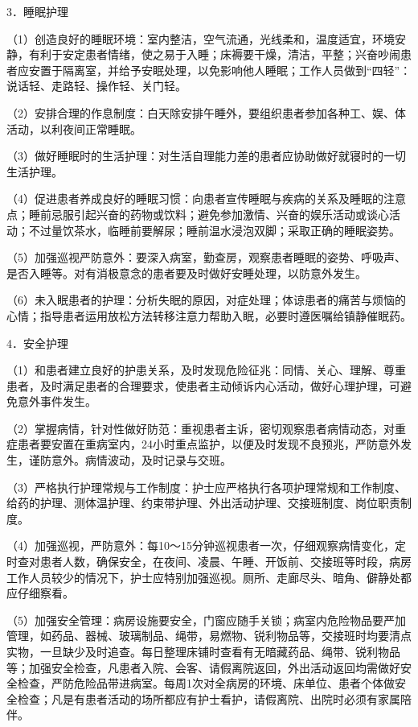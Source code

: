 3．睡眠护理

（1）创造良好的睡眠环境：室内整洁，空气流通，光线柔和，温度适宜，环境安静，有利于安定患者情绪，使之易于入睡；床褥要干燥，清洁，平整；兴奋吵闹患者应安置于隔离室，并给予安眠处理，以免影响他人睡眠；工作人员做到“四轻”：说话轻、走路轻、操作轻、关门轻。

（2）安排合理的作息制度：白天除安排午睡外，要组织患者参加各种工、娱、体活动，以利夜间正常睡眠。

（3）做好睡眠时的生活护理：对生活自理能力差的患者应协助做好就寝时的一切生活护理。

（4）促进患者养成良好的睡眠习惯：向患者宣传睡眠与疾病的关系及睡眠的注意点；睡前忌服引起兴奋的药物或饮料；避免参加激情、兴奋的娱乐活动或谈心活动；不过量饮茶水，临睡前要解尿；睡前温水浸泡双脚；采取正确的睡眠姿势。

（5）加强巡视严防意外：要深入病室，勤查房，观察患者睡眠的姿势、呼吸声、是否入睡等。对有消极意念的患者要及时做好安睡处理，以防意外发生。

（6）未入眠患者的护理：分析失眠的原因，对症处理；体谅患者的痛苦与烦恼的心情；指导患者运用放松方法转移注意力帮助入眠，必要时遵医嘱给镇静催眠药。

4．安全护理

（1）和患者建立良好的护患关系，及时发现危险征兆：同情、关心、理解、尊重患者，及时满足患者的合理要求，使患者主动倾诉内心活动，做好心理护理，可避免意外事件发生。

（2）掌握病情，针对性做好防范：重视患者主诉，密切观察患者病情动态，对重症患者要安置在重病室内，24小时重点监护，以便及时发现不良预兆，严防意外发生，谨防意外。病情波动，及时记录与交班。

（3）严格执行护理常规与工作制度：护士应严格执行各项护理常规和工作制度、给药的护理、测体温护理、约束带护理、外出活动护理、交接班制度、岗位职责制度。

（4）加强巡视，严防意外：每10～15分钟巡视患者一次，仔细观察病情变化，定时查对患者人数，确保安全，在夜间、凌晨、午睡、开饭前、交接班等时段，病房工作人员较少的情况下，护士应特别加强巡视。厕所、走廊尽头、暗角、僻静处都应仔细察看。

（5）加强安全管理：病房设施要安全，门窗应随手关锁；病室内危险物品要严加管理，如药品、器械、玻璃制品、绳带，易燃物、锐利物品等，交接班时均要清点实物，一旦缺少及时追查。每日整理床铺时查看有无暗藏药品、绳带、锐利物品等；加强安全检查，凡患者入院、会客、请假离院返回，外出活动返回均需做好安全检查，严防危险品带进病室。每周1次对全病房的环境、床单位、患者个体做安全检查；凡是有患者活动的场所都应有护士看护，请假离院、出院时必须有家属陪伴。

